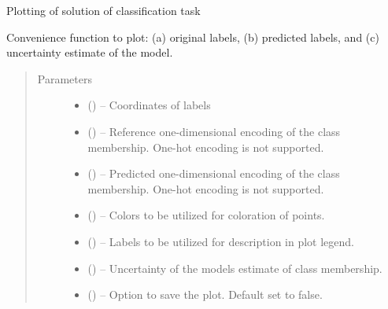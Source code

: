 \documentclass[letterpaper,10pt,english]{sphinxmanual}
\begin{document}
\begin{fulllineitems}
\label{\detokenize{api/ucf.plot_solution:ucf.plot_solution}}
Plotting of solution of classification task

Convenience function to plot: (a) original labels, (b) predicted
labels, and (c) uncertainty estimate of the model.
\begin{quote}\begin{description}
\item[{Parameters}] \leavevmode\begin{itemize}
\item {} 
 () -- Coordinates of labels

\item {} 
 () -- Reference one-dimensional encoding of the class membership.
One-hot encoding is not supported.

\item {} 
 () -- Predicted one-dimensional encoding of the class membership.
One-hot encoding is not supported.

\item {} 
 () -- Colors to be utilized for coloration of points.

\item {} 
 () -- Labels to be utilized for description in plot legend.

\item {} 
 () -- Uncertainty of the models estimate of class membership.

\item {} 
 () -- Option to save the plot. Default set to false.


\end{itemize}
\end{description}
\end{quote}
\end{fulllineitems}
\end{document}
